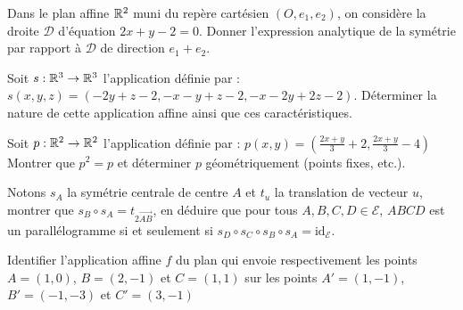 \be
Dans le plan affine $\mathbb{R}^2$ muni du repère cartésien $(O,e_1,e_2)$, on considère la droite $\mathcal D$ d'équation $2x+y-2=0$. Donner l'expression analytique de la symétrie par rapport à $\mathcal D$ de direction $e_1+e_2$.
\ee

\medskip

\be
Soit $s:\mathbb{R}^3\to\mathbb{R}^3$ l'application définie par : $s(x,y,z)=(-2y+z-2,-x-y+z-2,-x-2y+2z-2)$. Déterminer la nature de cette application affine ainsi que ces caractéristiques.
\ee

\medskip

\be
Soit $p:\mathbb{R}^2\to\mathbb{R}^2$ l'application définie par : $p(x,y)=\left(\frac{2x+y}3+2,\frac{2x+y}3-4\right)$\\
Montrer que $p^2 = p$ et déterminer $p$ géométriquement (points fixes, etc.).
\ee

\medskip

\be
Notons $s_A$ la symétrie centrale de centre $A$ et $t_u$ la translation de vecteur $u$, montrer que $s_B\circ s_A=t_{2\overrightarrow{AB}}$, en déduire que pour tous $A,B,C,D \in \mathcal E$, $ABCD$ est un parallélogramme si et seulement si $s_D\circ s_C\circ s_B\circ s_A=\mathrm{id}_{\mathcal E}$.
\ee

\medskip

\be %
Identifier l'application affine $f$ du plan qui envoie respectivement les points $A = (1,0)$, $B = (2,-1)$ et $C = (1,1)$ sur les points $A' = (1,-1)$, $B' = (-1,-3)$ et $C' = (3,-1)$
\solution{
}
\ee

\medskip

